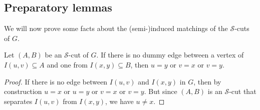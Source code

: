 \documentclass[a4paper,UKenglish,cleveref,hyperref,autoref]{lipics-v2021}
\begin{document}
\subsection{Preparatory lemmas}

\renewcommand{\part}{\text{part}}

We will now prove some facts about the (semi-)induced matchings of the $\mathcal S$-cuts of $G$.

\begin{lemma}\label{lem:no-dummy-edge-S-cut}
	Let $(A, B)$ be an $\mathcal S$-cut of $G$.
	If there is no dummy edge between a vertex of $I(u,v)\subseteq A$ and one from $I(x,y)\subseteq B$, then $u=y$ or $v=x$ or $v=y$.
\end{lemma}
\begin{proof}
	If there is no edge between $I(u,v)$ and $I(x,y)$ in $G$, then by construction $u=x$ or $u=y$ or $v=x$ or $v=y$.
	But since $(A,B)$ is an $\mathcal S$-cut that separates $I(u,v)$ from $I(x,y)$, we have $u\neq x$.
\end{proof}
\end{document}
